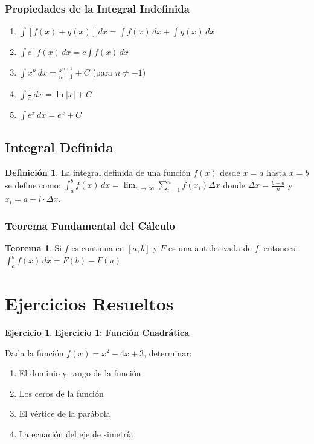 \documentclass[12pt, a4paper, oneside]{book}
\theoremstyle{definition}
\newtheorem{definicion}{Definición}[chapter]
\newtheorem{teorema}{Teorema}[chapter]
\newtheorem{ejercicio}{Ejercicio}[chapter]
\begin{document}
\subsubsection{Propiedades de la Integral Indefinida}

\begin{enumerate}
    \item $\int [f(x) + g(x)] \, dx = \int f(x) \, dx + \int g(x) \, dx$
    \item $\int c \cdot f(x) \, dx = c \int f(x) \, dx$
    \item $\int x^n \, dx = \frac{x^{n+1}}{n+1} + C$ (para $n \neq -1$)
    \item $\int \frac{1}{x} \, dx = \ln|x| + C$
    \item $\int e^x \, dx = e^x + C$
\end{enumerate}

\subsection{Integral Definida}

\begin{definicion}
La integral definida de una función $f(x)$ desde $x = a$ hasta $x = b$ se define como:
$\int_a^b f(x) \, dx = \lim_{n \to \infty} \sum_{i=1}^n f(x_i) \Delta x$
donde $\Delta x = \frac{b-a}{n}$ y $x_i = a + i \cdot \Delta x$.
\end{definicion}

\subsubsection{Teorema Fundamental del Cálculo}

\begin{teorema}
Si $f$ es continua en $[a,b]$ y $F$ es una antiderivada de $f$, entonces:
$\int_a^b f(x) \, dx = F(b) - F(a)$
\end{teorema}

\section{Ejercicios Resueltos}

\begin{ejercicio}
\textbf{Ejercicio 1: Función Cuadrática}

Dada la función $f(x) = x^2 - 4x + 3$, determinar:
\begin{enumerate}[label=\alph*)]
    \item El dominio y rango de la función
    \item Los ceros de la función
    \item El vértice de la parábola
    \item La ecuación del eje de simetría
\end{enumerate}
\end{ejercicio}
\end{document}
